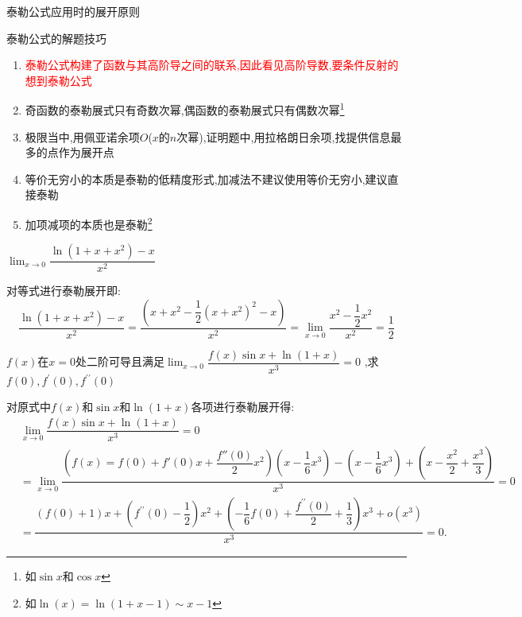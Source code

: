 \documentclass[9pt a4paper, oneside, UTF8]{ctexbook}
\begin{document}
\begin{sloppypar}
\begin{criterion}{泰勒公式应用时的展开原则}{}
\begin{itemize}
        \end{itemize}
    \end{criterion}
    \begin{criterion}{泰勒公式的解题技巧}{}
        \begin{enumerate}
            \item \textcolor{red}{泰勒公式构建了函数与其高阶导之间的联系,因此看见高阶导数,要条件反射的想到泰勒公式}
            \item 奇函数的泰勒展式只有奇数次幂,偶函数的泰勒展式只有偶数次幂\footnote{如$\sin x$和$\cos x$}
            \item 极限当中,用佩亚诺余项$O$($x$的$n$次幂),证明题中,用拉格朗日余项,找提供信息最多的点作为展开点
            \item 等价无穷小的本质是泰勒的低精度形式,加减法不建议使用等价无穷小,建议直接泰勒
            \item 加项减项的本质也是泰勒\footnote{如$\ln(x)=\ln(1+x-1)\sim x-1$}
        \end{enumerate}
    \end{criterion}
    \begin{problem}
        $\lim_{x\to0}\dfrac{\ln\left(1+x+x^{2}\right)-x}{x^{2}}$
    \end{problem}
    \begin{solution}
        对等式进行泰勒展开即:\\$$\dfrac{\ln(1+x+x^2)-x}{x^2}=\dfrac{(x+x^2-\dfrac{1}{2}(x+x^2)^2-x)}{x^2}=\lim_{x \to 0}\dfrac{x^2-\dfrac{1}{2}x^2}{x^2}=\dfrac{1}{2}$$
    \end{solution}
    \begin{problem}
        $f(x)$在$x=0$处二阶可导且满足$\lim_{x\to 0}\dfrac{f(x)\sin x+\ln(1+x)}{x^3}=0$ ,求$f(0),f^{\prime}(0),f^{\prime\prime}(0)$
    \end{problem}
    \begin{solution}
        对原式中$f(x)$和$\sin x$和$\ln(1+x)$各项进行泰勒展开得:
    \begin{equation*}
        \begin{split}    
            & \lim_{x\to 0}\dfrac{f(x)\sin x+\ln(1+x)}{x^3}=0 \\
            & = \lim_{x \to 0}\dfrac{(f(x)=f(0)+f'(0)x+\dfrac{f''(0)}{2}x^2)(x-\dfrac{1}{6}x^3)-(x-\dfrac{1}{6}x^3)+(x-\dfrac{x^2}{2}+\dfrac{x^3}{3})}{x^3}=0 \\
            & = \dfrac{(f(0)+1)x+(f^{\prime\prime}(0)-\dfrac{1}{2})x^{2}+(-\dfrac{1}{6}f(0)+\dfrac{f^{\prime\prime}(0)}{2}+\dfrac{1}{3})x^{3}+o(x^{3})}{x^{3}}=0.
    \end{split}

\end{equation*}
\end{solution}
\end{sloppypar}
\end{document}
